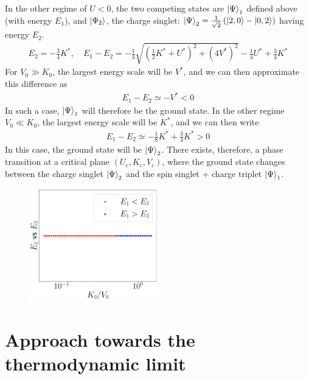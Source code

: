\documentclass{report}
\numberwithin{equation}{section}
\begin{document}
In the other regime of \(U<0\), the two competing states are \(\ket{\Psi}_1\) defined above (with energy \(E_1\)), and \(\ket{\Psi_2}\), the charge singlet: \(\ket{\Psi}_2 = \frac{1}{\sqrt 2}\left( \ket{2,0} - \ket{0,2} \right)\) having energy \(E_2\).
\begin{equation}\begin{aligned}
	E_2 = -\frac{3}{4}K^*, \quad E_1 - E_2 = -\frac{1}{4}\sqrt{\left( \frac{1}{2}K^* + U^* \right)^2 + (4V^*)^2} - \frac{1}{4}U^* + \frac{3}{4}K^*
\end{aligned}\end{equation}
For \(V_0 \gg K_0\), the largest energy scale will be \(V^*\), and we can then approximate this difference as
\begin{equation}\begin{aligned}
	E_1 - E_2 \simeq -V^* < 0
\end{aligned}\end{equation}
In such a case, \(\ket{\Psi}_1\) will therefore be the ground state. In the other regime \(V_0 \ll K_0\), the largest energy scale will be \(K^*\), and we can then write
\begin{equation}\begin{aligned}
	E_1 - E_2 \simeq - \frac{1}{8}K^* + \frac{3}{4}K^* > 0
\end{aligned}\end{equation}
In this case, the ground state will be \(\ket{\Psi}_2\). There exists, therefore, a phase transition at a critical plane \((U_c, K_c, V_c)\), where the ground state changes between the charge singlet \(\ket{\Psi}_2\) and the spin singlet + charge triplet \(\ket{\Psi}_1\).
\begin{figure}[htpb]
	\centering
	\includegraphics[width=0.5\textwidth]{../figures/E1_vs_E3.pdf}
\end{figure}

\section{Approach towards the thermodynamic limit}
\end{document}
